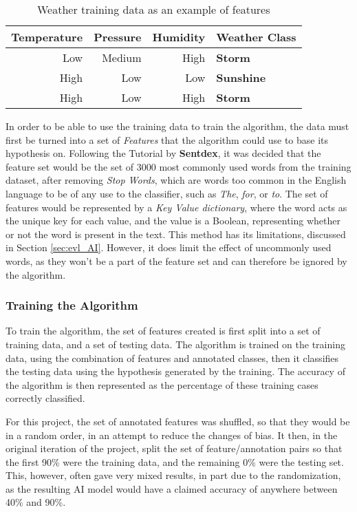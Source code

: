 \begin{table}[ht!]
\centering
\begin{tabular}{r | r | r || l}
\textbf{Temperature} & \textbf{Pressure} & \textbf{Humidity} & \textbf{Weather Class} \\
\hline
Low  & Medium  & High & \textbf{Storm}    \\
High & Low     & Low  & \textbf{Sunshine} \\
High & Low     & High & \textbf{Storm}

\end{tabular}
\caption{Weather training data as an example of features}
\label{tbl:weather_feature}
\end{table}

In order to be able to use the training data to train the algorithm, the data must first be turned into a set of \emph{Features} that the algorithm could use to base its hypothesis on. Following the Tutorial by \textbf{Sentdex}\cite{NLTKYoutubePlaylist}, it was decided that the feature set would be the set of 3000 most commonly used words from the training dataset, after removing \emph{Stop Words}, which are words too common in the English language to be of any use to the classifier, such as \emph{The}, \emph{for}, or \emph{to}. The set of features would be represented by a \emph{Key Value dictionary}, where the word acts as the unique key for each value, and the value is a Boolean, representing whether or not the word is present in the text. This method has its limitations, discussed in Section \ref{sec:evl_AI}. However, it does limit the effect of uncommonly used words, as they won't be a part of the feature set and can therefore be ignored by the algorithm.

\subsubsection{Training the Algorithm}
\label{sec:imp_train_algorithm}
To train the algorithm, the set of features created is first split into a set of training data, and a set of testing data. The algorithm is trained on the training data, using the combination of features and annotated classes, then it classifies the testing data using the hypothesis generated by the training. The accuracy of the algorithm is then represented as the percentage of these training cases correctly classified.

For this project, the set of annotated features was shuffled, so that they would be in a random order, in an attempt to reduce the changes of bias. It then, in the original iteration of the project, split the set of feature/annotation pairs so that the first 90\% were the training data, and the remaining 0\% were the testing set. This, however, often gave very mixed results, in part due to the randomization, as the resulting AI model would have a claimed accuracy of anywhere between 40\% and 90\%.

